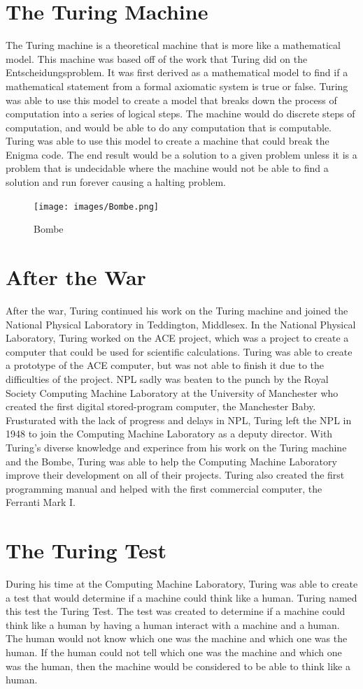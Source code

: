 \documentclass[12pt]{article}
\begin{document}
\section*{The Turing Machine}
The Turing machine is a theoretical machine that is more like a mathematical model.
This machine was based off of the work that Turing did on the Entscheidungsproblem.
It was first derived as a mathematical model to find if a mathematical statement from a
formal axiomatic system is true or false. Turing was able to use this model to create a 
model that breaks down the process of computation into a series of logical steps.
The machine would do discrete steps of computation, and would be able to do any computation
that is computable. Turing was able to use this model to create a machine that could break the Enigma code.
The end result would be a solution to a given problem unless it is a problem that is undecidable
where the machine would not be able to find a solution and run forever causing a halting problem.

\begin{figure}[h]
    \centering
    \texttt{[image: images/Bombe.png]}
    \caption{Bombe}
\end{figure}

\section*{After the War}
After the war, Turing continued his work on the Turing machine and joined
the National Physical Laboratory in Teddington, Middlesex. 
In the National Physical Laboratory, Turing worked on the ACE project, which was a project
to create a computer that could be used for scientific calculations. Turing was able to create
a prototype of the ACE computer, but was not able to finish it due to the difficulties of the project.
NPL sadly was beaten to the punch by the Royal Society Computing Machine Laboratory at the University of Manchester
who created the first digital stored-program computer, the Manchester Baby. Frusturated with the lack of progress
and delays in NPL, Turing left the NPL in 1948 to join the Computing Machine Laboratory as a deputy director.
With Turing's diverse knowledge and experince from his work on the Turing machine and the Bombe, Turing was able
to help the Computing Machine Laboratory improve their development on all of their projects.
Turing also created the first programming manual and helped with the first commercial computer, the Ferranti Mark I.

\section*{The Turing Test}
During his time at the Computing Machine Laboratory, Turing was able to create a test that would
determine if a machine could think like a human. Turing named this test the Turing Test.
The test was created to determine if a machine could think like a human by having a human
interact with a machine and a human. The human would not know which one was the machine
and which one was the human. If the human could not tell which one was the machine and which one was the human,
then the machine would be considered to be able to think like a human. 
\end{document}
